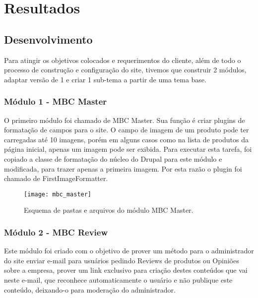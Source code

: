 \chapter{Resultados}

\graphicspath{ {/var/www/html/meninadasbalas/project/monografia/latex/images/} }

\section{Desenvolvimento}
Para atingir os objetivos colocados e requerimentos do cliente, além de todo o processo de construção e configuração do site, tivemos que construir 2 módulos, adaptar versão de 1 e criar 1 sub-tema a partir de uma tema base.

\subsection{Módulo 1 - MBC Master}
O primeiro módulo foi chamado de MBC Master. Sua função é criar plugins de formatação de campos para o site. O campo de imagem de um produto pode ter carregadas até 10 imagens, porém em alguns casos como na lista de produtos da página inicial, apenas um imagem pode ser exibida. Para executar esta tarefa, foi copiado a classe de formatação do núcleo do Drupal para este módulo e modificada, para trazer apenas a primeira imagem. Por esta razão o plugin foi chamado de FirstImageFormatter.

\begin{figure}[ht]
  \centering
  \texttt{[image: mbc\_master]}
  \caption{Esquema de pastas e arquivos do módulo MBC Master.}
  \label{mbc_master}
\end{figure}

\subsection{Módulo 2 - MBC Review}
Este módulo foi criado com o objetivo de prover um método para o administrador do site enviar e-mail para usuários pedindo Reviews de produtos ou Opiniões sobre a empresa, prover um link exclusivo para criação destes conteúdos que vai neste e-mail, que reconhece automaticamente o usuário e não publique este conteúdo, deixando-o para moderação do administrador.

